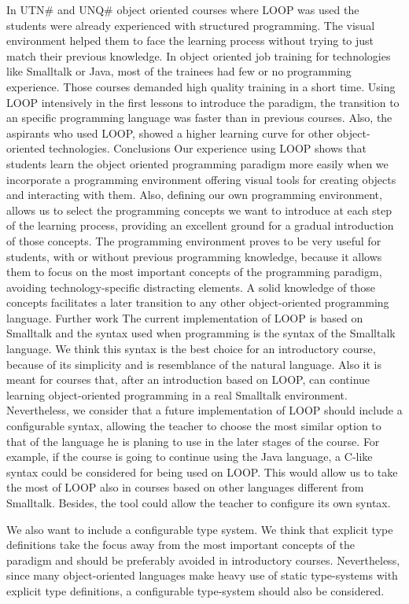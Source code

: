 \documentclass{sigplanconf}
\begin{document}
In UTN# and UNQ# object oriented courses where LOOP was used the students were already experienced with structured programming.  The visual environment helped them to face the learning process without trying to just match their previous knowledge.
In object oriented job training for technologies like Smalltalk or Java, most of the trainees had few or no programming experience. Those courses demanded high quality training in a short time. Using LOOP intensively in the first lessons to introduce the paradigm, the transition to an specific programming language was faster than in previous courses. Also, the aspirants who used LOOP, showed a higher learning curve for other object-oriented technologies.
Conclusions
Our experience using LOOP shows that students learn the object oriented programming paradigm more easily when we incorporate a programming environment offering visual tools for creating objects and interacting with them. Also, defining our own programming environment, allows us to select the programming concepts we want to introduce at each step of the learning process, providing an excellent ground for a gradual introduction of those concepts. The programming environment proves to be very useful for students, with or without previous programming knowledge, because it allows them to focus on the most important concepts of the programming paradigm, avoiding technology-specific distracting elements. A solid knowledge of those concepts facilitates a later transition to any other object-oriented programming language.
Further work
The current implementation of LOOP is based on Smalltalk and the syntax used when programming is the syntax of the Smalltalk language. We think this syntax is the best choice for an introductory course, because of its simplicity and is resemblance of the natural language. Also it is meant for courses that, after an introduction based on LOOP, can continue learning object-oriented programming in a real Smalltalk environment. Nevertheless, we consider that a future implementation of LOOP should include a configurable syntax, allowing the teacher to choose the most similar option to that of the language he is planing to use in the later stages of the course. For example, if the course is going to continue using the Java language, a C-like syntax could be considered for being used on LOOP. This would allow us to take the most of LOOP also in courses based on other languages different from Smalltalk. Besides, the tool could allow the teacher to configure its own syntax.

We also want to include a configurable type system. We think that explicit type definitions take the focus away from the most important concepts of the paradigm and should be preferably avoided in introductory courses. Nevertheless, since many object-oriented languages make heavy use of static type-systems with explicit type definitions, a configurable type-system should also be considered.
\end{document}
